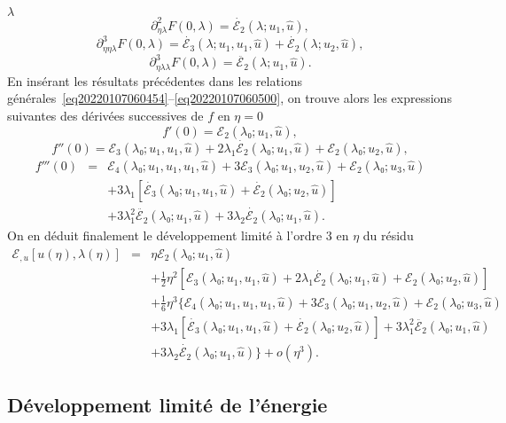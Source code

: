 \documentclass{article}
\begin{document}
$λ$
\begin{equation}
  \partial_{η  λ}^2 F (0, λ) = \dot{ℰ_2}
  (λ ; u_1, \hat{u}),
\end{equation}
\begin{equation}
  \partial_{η  η  λ}^3 F (0, λ) =
  \dot{ℰ_3} (λ ; u_1, u_1, \hat{u}) + \dot{ℰ_2}
  (λ ; u_2, \hat{u}),
\end{equation}
\begin{equation}
  \partial_{η  λ  λ}^3 F (0, λ) =
  \ddot{ℰ_2} (λ ; u_1, \hat{u}) .
\end{equation}
En insérant les résultats précédentes dans les relations
générales~\eqref{eq20220107060454}--\eqref{eq20220107060500}, on
trouve alors les expressions suivantes des dérivées successives de $f$
en $η = 0$
\begin{equation}
  f' (0) =ℰ_2 (λ₀ ; u_1, \hat{u}),
\end{equation}
\begin{equation}
  f'' (0) =ℰ_3 (λ₀ ; u_1, u_1, \hat{u}) + 2 λ_1
  \dot{ℰ_2} (λ₀ ; u_1, \hat{u}) +ℰ_2 (λ₀ ;
  u_2, \hat{u}),
\end{equation}
\begin{eqnarray}
  f''' (0) & = & ℰ_4 (λ₀ ; u_1, u_1, u_1, \hat{u}) +
  3ℰ_3 (λ₀ ; u_1, u_2, \hat{u}) +ℰ_2 (λ₀ ;
  u_3, \hat{u}) \nonumber\\
  &  &  + 3 λ_1  [\dot{ℰ_3} (λ₀ ; u_1, u_1,
  \hat{u}) + \dot{ℰ_2} (λ₀ ; u_2, \hat{u})] \nonumber\\
  &  &  + 3 λ_1^2  \ddot{ℰ_2} (λ₀ ; u_1,
  \hat{u}) + 3 λ_2  \dot{ℰ_2} (λ₀ ; u_1, \hat{u}) .
\end{eqnarray}
On en déduit finalement le développement limité à l'ordre 3 en
$η$ du résidu
\begin{eqnarray}
  ℰ_{, u} [u (η), λ (η)] & = & η ℰ_2
  (λ₀ ; u_1, \hat{u}) \nonumber\\
  &  &  + \tfrac{1}{2} η^2  [ℰ_3 (λ₀ ; u_1, u_1,
  \hat{u}) + 2 λ_1  \dot{ℰ_2} (λ₀ ; u_1, \hat{u})
  +ℰ_2 (λ₀ ; u_2, \hat{u})] \nonumber\\
  &  &  + \tfrac{1}{6} η^3  \{ ℰ_4 (λ₀ ; u_1,
  u_1, u_1, \hat{u}) + 3ℰ_3 (λ₀ ; u_1, u_2, \hat{u})
   +ℰ_2 (λ₀ ; u_3, \hat{u}) \nonumber\\
  &  &  + 3 λ_1  [\dot{ℰ_3} (λ₀ ; u_1, u_1,
  \hat{u}) + \dot{ℰ_2} (λ₀ ; u_2, \hat{u})] + 3 λ_1^2
  \ddot{ℰ_2} (λ₀ ; u_1, \hat{u}) \nonumber\\
  &  &   + 3 λ_2  \dot{ℰ_2} (λ₀ ;
  u_1, \hat{u}) \} + o (η^3) .  \label{eq20220107080901}
\end{eqnarray}
\subsection{Développement limité de l'énergie}\label{sec:DL
energie}
\end{document}
